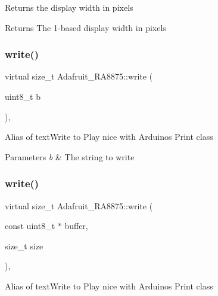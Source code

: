Returns the display width in pixels

\begin{DoxyReturn}{Returns}
The 1-\/based display width in pixels 
\end{DoxyReturn}
\mbox{\label{class_adafruit___r_a8875_a66a7c8f7f836c67d3f0952b94a3e420c}} 
\subsubsection{\texorpdfstring{write()}{write()}\hspace{0.1cm}{\footnotesize\ttfamily [1/2]}}
{\footnotesize\ttfamily virtual size\+\_\+t Adafruit\+\_\+\+R\+A8875\+::write (\begin{DoxyParamCaption}\item[{uint8\+\_\+t}]{b }\end{DoxyParamCaption})\hspace{0.3cm}{\ttfamily [inline]}, {\ttfamily [virtual]}}

Alias of text\+Write to Play nice with Arduino\textquotesingle{}s Print class


\begin{DoxyParams}{Parameters}
{\em b} & The string to write \\
\hline
\end{DoxyParams}
\mbox{\label{class_adafruit___r_a8875_a0956b49201ae4618a9a20d828f3815b1}} 
\subsubsection{\texorpdfstring{write()}{write()}\hspace{0.1cm}{\footnotesize\ttfamily [2/2]}}
{\footnotesize\ttfamily virtual size\+\_\+t Adafruit\+\_\+\+R\+A8875\+::write (\begin{DoxyParamCaption}\item[{const uint8\+\_\+t $\ast$}]{buffer,  }\item[{size\+\_\+t}]{size }\end{DoxyParamCaption})\hspace{0.3cm}{\ttfamily [inline]}, {\ttfamily [virtual]}}

Alias of text\+Write to Play nice with Arduino\textquotesingle{}s Print class


